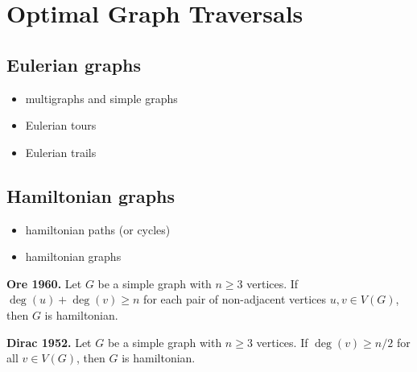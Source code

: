 
\chapter{Optimal Graph Traversals}



\section{Eulerian graphs}

\begin{itemize}
\item multigraphs and simple graphs

\item Eulerian tours

\item Eulerian trails
\end{itemize}



\section{Hamiltonian graphs}

\begin{itemize}
\item hamiltonian paths (or cycles)

\item hamiltonian graphs
\end{itemize}

\begin{theorem}
\textbf{Ore 1960.}
Let $G$ be a simple graph with $n \geq 3$ vertices. If
$\deg(u) + \deg(v) \geq n$ for each pair of non-adjacent vertices
$u, v \in V(G)$, then $G$ is hamiltonian.
\end{theorem}

\begin{corollary}
\textbf{Dirac 1952.}
Let $G$ be a simple graph with $n \geq 3$ vertices. If
$\deg(v) \geq n / 2$ for all $v \in V(G)$, then $G$ is hamiltonian.
\end{corollary}


